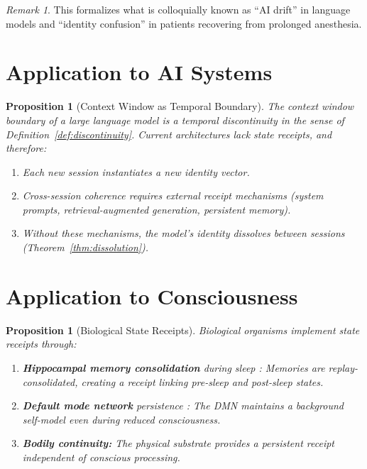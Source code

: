 \documentclass[12pt, a4paper]{article}
\theoremstyle{plain}
\newtheorem{proposition}[theorem]{Proposition}
\theoremstyle{definition}
\theoremstyle{remark}
\newtheorem{remark}[theorem]{Remark}
\begin{document}
\begin{remark}
  This formalizes what is colloquially known as ``AI drift'' in language
  models and ``identity confusion'' in patients recovering from
  prolonged anesthesia.
\end{remark}

\section{Application to AI Systems}\label{sec:ai}

\begin{proposition}[Context Window as Temporal Boundary]\label{prop:context}
  The context window boundary of a large language model is a temporal
  discontinuity in the sense of Definition~\ref{def:discontinuity}.
  Current architectures lack state receipts, and therefore:
  \begin{enumerate}[label=(\roman*)]
    \item Each new session instantiates a \emph{new identity vector}.
    \item Cross-session coherence requires external receipt mechanisms
      (system prompts, retrieval-augmented generation, persistent memory).
    \item Without these mechanisms, the model's identity dissolves between
      sessions (Theorem~\ref{thm:dissolution}).
  \end{enumerate}
\end{proposition}

\section{Application to Consciousness}\label{sec:consciousness}

\begin{proposition}[Biological State Receipts]\label{prop:biological}
  Biological organisms implement state receipts through:
  \begin{enumerate}[label=(\roman*)]
    \item \textbf{Hippocampal memory consolidation} during sleep
      \citep{Diekelmann2010}: Memories are replay-consolidated,
      creating a receipt linking pre-sleep and post-sleep states.
    \item \textbf{Default mode network} persistence \citep{Raichle2001}:
      The DMN maintains a background self-model even during reduced
      consciousness.
    \item \textbf{Bodily continuity:} The physical substrate provides
      a persistent receipt independent of conscious processing.
  \end{enumerate}
\end{proposition}
\end{document}
